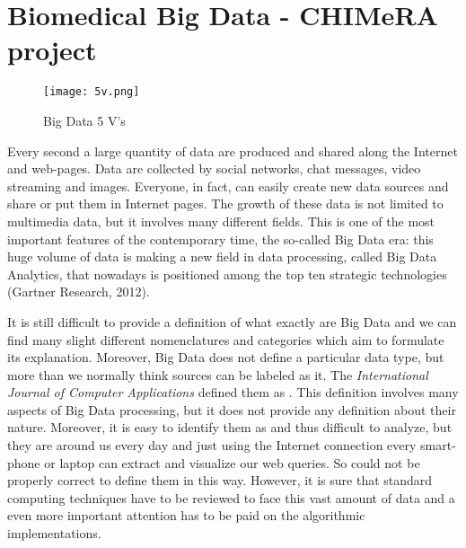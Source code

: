\documentclass{standalone}
\begin{document}
\chapter[Big Data]{Biomedical Big Data - CHIMeRA project}\label{chapter3:bigdata}

\begin{center}
\begin{figure}[htbp]
\centering
\texttt{[image: 5v.png]}
\caption{Big Data 5 V's}
\label{fig:5v}
\end{figure}
\end{center}

Every second a large quantity of data are produced and shared along the Internet and web-pages.
Data are collected by social networks, chat messages, video streaming and images.
Everyone, in fact, can easily create new data sources and share or put them in Internet pages.
The growth of these data is not limited to multimedia data, but it involves many different fields.
This is one of the most important features of the contemporary time, the so-called Big Data era: this huge volume of data is making a new field in data processing, called Big Data Analytics, that nowadays is positioned among the top ten strategic technologies (Gartner Research, 2012).

It is still difficult to provide a definition of what exactly are Big Data and we can find many slight different nomenclatures and categories which aim to formulate its explanation.
Moreover, Big Data does not define a particular data type, but more than we normally think sources can be labeled as it.
The \emph{International Journal of Computer Applications} defined them as .
This definition involves many aspects of Big Data processing, but it does not provide any definition about their nature.
Moreover, it is easy to identify them as  and thus difficult to analyze, but they are around us every day and just using the Internet connection every smart-phone or laptop can extract and visualize our web queries.
So could not be properly correct to define them in this way.
However, it is sure that standard computing techniques have to be reviewed to face this vast amount of data and a even more important attention has to be paid on the algorithmic implementations.
\end{document}
